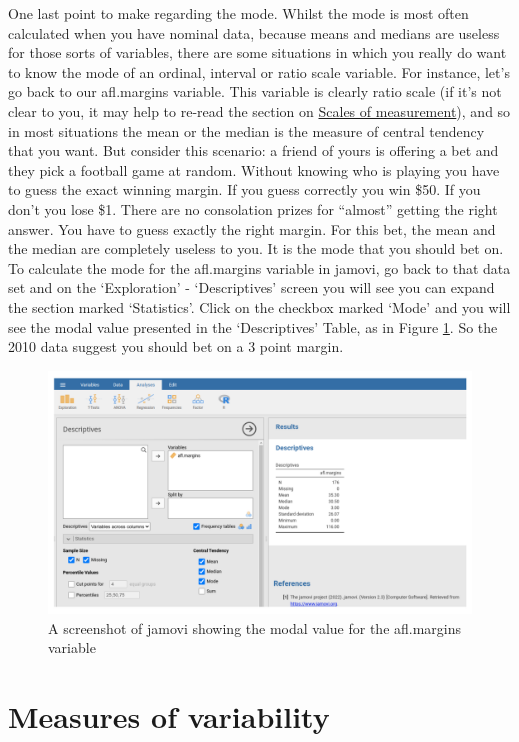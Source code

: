 \documentclass[
]{book}
\begin{document}
One last point to make regarding the mode. Whilst the mode is most often calculated when you have nominal data, because means and medians are useless for those sorts of variables, there are some situations in which you really do want to know the mode of an ordinal, interval or ratio scale variable. For instance, let's go back to our afl.margins variable. This variable is clearly ratio scale (if it's not clear to you, it may help to re-read the section on \protect\hyperlink{scales-of-measurement}{Scales of measurement}), and so in most situations the mean or the median is the measure of central tendency that you want. But consider this scenario: a friend of yours is offering a bet and they pick a football game at random. Without knowing who is playing you have to guess the exact winning margin. If you guess correctly you win \$50. If you don't you lose \$1. There are no consolation prizes for ``almost'' getting the right answer. You have to guess exactly the right margin. For this bet, the mean and the median are completely useless to you. It is the mode that you should bet on. To calculate the mode for the afl.margins variable in jamovi, go back to that data set and on the `Exploration' - `Descriptives' screen you will see you can expand the section marked `Statistics'. Click on the checkbox marked `Mode' and you will see the modal value presented in the `Descriptives' Table, as in Figure \ref{fig:fig4-7}. So the 2010 data suggest you should bet on a 3 point margin.

\begin{figure}
\includegraphics[width=0.9\linewidth]{images/Figure14} \caption{A screenshot of jamovi showing the modal value for the afl.margins variable}\label{fig:fig4-7}
\end{figure}

\hypertarget{measures-of-variability}{%
\section{Measures of variability}\label{measures-of-variability}}
\end{document}
